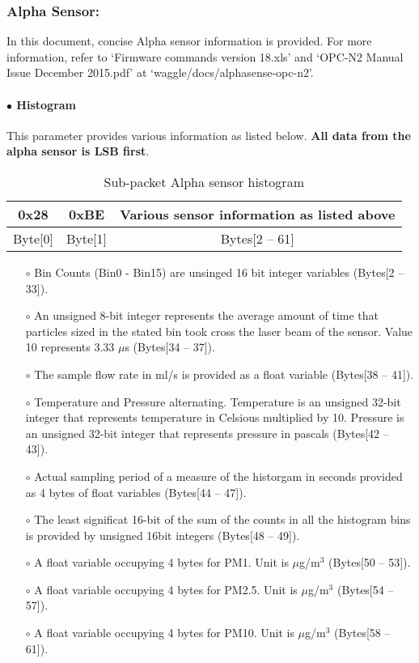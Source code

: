 
\subsubsection{Alpha Sensor:}
In this document, concise Alpha sensor information is provided. For more information, refer to `Firmware commands version 18.xls' and `OPC-N2 Manual Issue December 2015.pdf' at `waggle/docs/alphasense-opc-n2'.

\paragraph{$\bullet$ Histogram}
This parameter provides various information as listed below. \textbf{All data from the alpha sensor is LSB first}.


\begin{table}[h!]
    \centering
    \caption{Sub-packet Alpha sensor histogram}
    \begin{tabular}{|c|c|c|}
        \hline
        \rowcolor{black!8}
        \textbf{0x28} & \textbf{0xBE} & \textbf{Various sensor information as listed above}\\
        \hline
        Byte[0] & Byte[1] & Bytes[2 -- 61] \\ \hline
    \end{tabular}
\end{table}


\begin{itemize}
\setlength\itemsep{0em}
\item[$\circ$] Bin Counts (Bin0 - Bin15) are unsinged 16 bit integer variables (Bytes[2 -- 33]).
\item[$\circ$] An unsigned 8-bit integer represents the average amount of time that particles sized in the stated bin took cross the laser beam of the sensor. Value 10 represents 3.33 $\mu$s (Bytes[34 -- 37]).
\item[$\circ$] The sample flow rate in ml/s is provided as a float variable (Bytes[38 -- 41]).
\item[$\circ$] Temperature and Pressure alternating. Temperature is an unsigned 32-bit integer that represents temperature in Celsious multiplied by 10. Pressure is an unsigned 32-bit integer that represents pressure in pascals (Bytes[42 -- 43]).
\item[$\circ$] Actual sampling period of a measure of the historgam in seconds provided as 4 bytes of float variables (Bytes[44 -- 47]).
\item[$\circ$] The least significat 16-bit of the sum of the counts in all the histogram bins is provided by unsigned 16bit integers (Bytes[48 -- 49]).
\item[$\circ$] A float variable occupying 4 bytes for PM1. Unit is $\mu$g/m$^3$ (Bytes[50 -- 53]).
\item[$\circ$] A float variable occupying 4 bytes for PM2.5. Unit is $\mu$g/m$^3$ (Bytes[54 -- 57]).
\item[$\circ$] A float variable occupying 4 bytes for PM10. Unit is $\mu$g/m$^3$ (Bytes[58 -- 61]).
\end{itemize}


